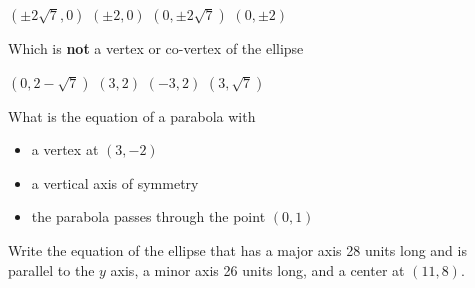 \documentclass[11pt]{exam}
\begin{document}
\begin{questions}
\begin{minipage}{\linewidth}
\begin{choices}
	\CorrectChoice $(\pm 2\sqrt7,0)$
	\choice $(\pm 2,0)$
	\choice $(0, \pm 2\sqrt7)$
	\choice $(0, \pm 2)$
\end{choices} \answerline
\vspace{0.5in}
\end{minipage}
\begin{minipage}{\linewidth}
\question[3]  Which is \textbf{not} a vertex or co-vertex of the ellipse 

\begin{choices}
	\choice $(0,2-\sqrt{7})$
	\choice $(3,2)$
	\choice $(-3,2)$
	\CorrectChoice $(3,\sqrt{7})$
\end{choices} \answerline
\vspace{0.5in}


\end{minipage}
\begin{minipage}{\linewidth}
\question[3] What is the equation of a parabola with
\begin{itemize}
	\item a vertex
 at $(3, -2)$
 \item a vertical axis of symmetry
 \item the parabola passes through the point $(0, 1)$
\end{itemize}

 \begin{choices}
\CorrectChoice {}
\choice {}
\choice {}
\choice {}
\choice {}
\end{choices} \answerline
\vspace{0.5in}


\end{minipage}
\begin{minipage}{\linewidth}
\question[3] Write the equation of the ellipse that has a major axis 28 units long and is parallel to the $y$ axis,
 a minor axis 26 units long, and a center at $(11, 8)$.
 \vspace{1ex}


\end{minipage}
\end{questions}
\end{document}
